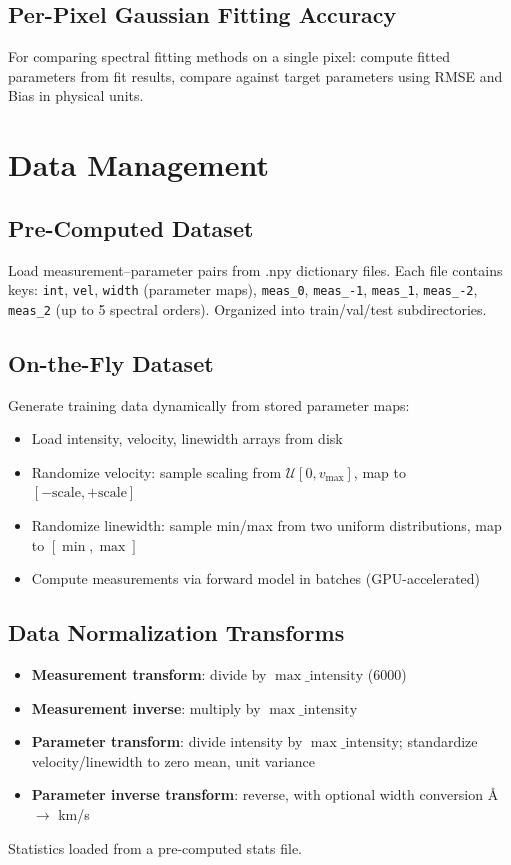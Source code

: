 \documentclass[11pt,a4paper]{article}
\begin{document}
\subsection{Per-Pixel Gaussian Fitting Accuracy}
For comparing spectral fitting methods on a single pixel: compute fitted parameters from fit results, compare against target parameters using RMSE and Bias in physical units.

\section{Data Management}

\subsection{Pre-Computed Dataset}
Load measurement--parameter pairs from .npy dictionary files. Each file contains keys: \texttt{int}, \texttt{vel}, \texttt{width} (parameter maps), \texttt{meas\_0}, \texttt{meas\_-1}, \texttt{meas\_1}, \texttt{meas\_-2}, \texttt{meas\_2} (up to 5 spectral orders). Organized into train/val/test subdirectories.

\subsection{On-the-Fly Dataset}
Generate training data dynamically from stored parameter maps:
\begin{itemize}[nosep]
  \item Load intensity, velocity, linewidth arrays from disk
  \item Randomize velocity: sample scaling from $\mathcal{U}[0, v_{\max}]$, map to $[-\text{scale}, +\text{scale}]$
  \item Randomize linewidth: sample min/max from two uniform distributions, map to $[\min, \max]$
  \item Compute measurements via forward model in batches (GPU-accelerated)
\end{itemize}

\subsection{Data Normalization Transforms}
\begin{itemize}[nosep]
  \item \textbf{Measurement transform}: divide by $\max\_\text{intensity}$ (6000)
  \item \textbf{Measurement inverse}: multiply by $\max\_\text{intensity}$
  \item \textbf{Parameter transform}: divide intensity by $\max\_\text{intensity}$; standardize velocity/linewidth to zero mean, unit variance
  \item \textbf{Parameter inverse transform}: reverse, with optional width conversion \AA{} $\rightarrow$ km/s
\end{itemize}
Statistics loaded from a pre-computed stats file.
\end{document}
